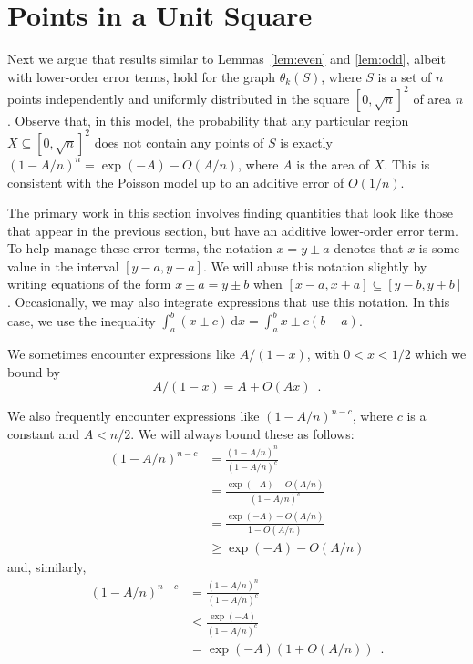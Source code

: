 \documentclass{patmorin}
\begin{document}
\section{Points in a Unit Square}

Next we argue that results similar to Lemmas~\ref{lem:even} and
\ref{lem:odd}, albeit with lower-order error terms, hold for the
graph $\theta_k(S)$, where $S$ is a set of $n$ points independently
and uniformly distributed in the square $[0,\sqrt{n}]^2$ of area $n$.
Observe that, in this model, the probability that any particular region
$X\subseteq [0,\sqrt{n}]^2$ does not contain any points of $S$ is exactly
$(1-A/n)^n=\exp(-A)-O(A/n)$, where $A$ is the area of $X$.  This is
consistent with the Poisson model up to an additive error of $O(1/n)$.

The primary work in this section involves finding quantities that look
like those that appear in the previous section, but have an additive
lower-order error term.  To help manage these error terms, the
notation $x= y\pm a$ denotes that $x$ is some value in the interval
$[y-a,y+a]$.  We will abuse this notation slightly by writing equations
of the form $x\pm a = y\pm b$ when $[x-a,x+a]\subseteq[y-b,y+b]$.
Occasionally, we may also integrate expressions that use this notation.
In this case, we use the inequality $\int_a^b (x\pm c)\,\mathrm{d}x =
\int_a^b x \pm c(b-a)$.

We sometimes encounter expressions like $A/(1-x)$, with $0<x<1/2$ which
we bound by
\[
   A/(1-x) = A+O(Ax) \enspace .
\]

We also frequently encounter expressions like $(1-A/n)^{n-c}$, where $c$
is a constant and $A < n/2$.  We will always bound these as follows:
\begin{align*}
   (1-A/n)^{n-c} 
      & = \frac{(1-A/n)^n}{(1-A/n)^c} \\
      & = \frac{\exp(-A)-O(A/n)}{(1-A/n)^c} \\
      & = \frac{\exp(-A)-O(A/n)}{1-O(A/n)} \\
      & \ge \exp(-A) - O(A/n) 
\end{align*}
and, similarly, 
\begin{align*}
   (1-A/n)^{n-c} 
      & = \frac{(1-A/n)^n}{(1-A/n)^c} \\
      & \le \frac{\exp(-A)}{(1-A/n)^c} \\
      & = \exp(-A)(1+O(A/n))  \enspace .
\end{align*}
\end{document}
